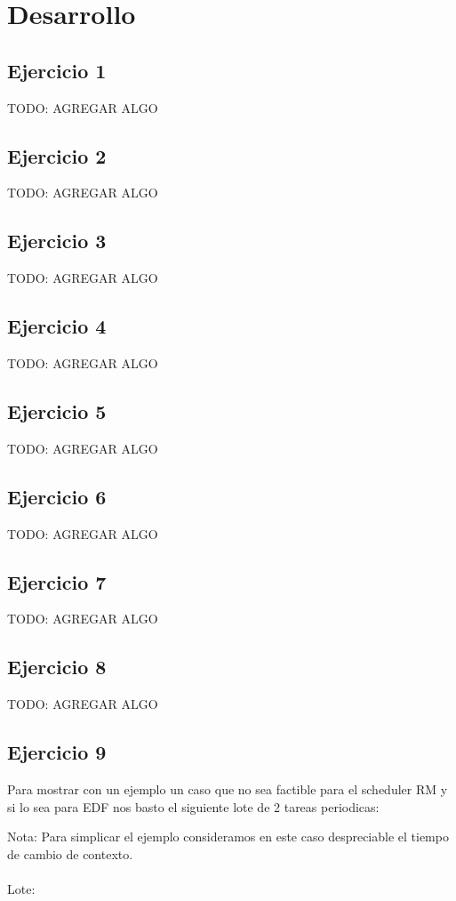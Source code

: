 \section{Desarrollo}

\subsection{Ejercicio 1}
TODO: AGREGAR ALGO

\subsection{Ejercicio 2}
TODO: AGREGAR ALGO

\subsection{Ejercicio 3}
TODO: AGREGAR ALGO

\subsection{Ejercicio 4}
TODO: AGREGAR ALGO

\subsection{Ejercicio 5}
TODO: AGREGAR ALGO

\subsection{Ejercicio 6}
TODO: AGREGAR ALGO

\subsection{Ejercicio 7}
TODO: AGREGAR ALGO

\subsection{Ejercicio 8}
TODO: AGREGAR ALGO

\subsection{Ejercicio 9}

Para mostrar con un ejemplo un caso que no sea factible para el scheduler RM y si lo sea para EDF nos basto el siguiente lote de 2 tareas periodicas:

Nota: Para simplicar el ejemplo consideramos en este caso despreciable el tiempo de cambio de contexto.
\\
\\
Lote:


